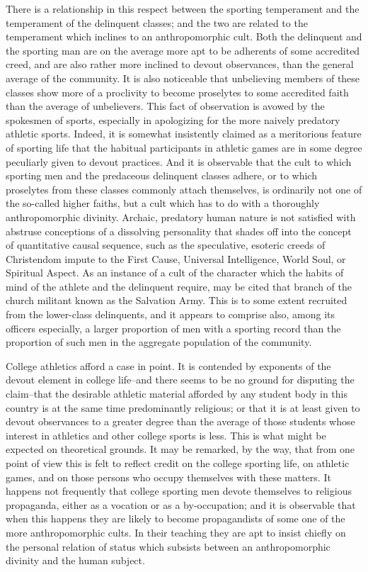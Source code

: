 \documentclass[12pt]{report}
\begin{document}
There is a relationship in this respect between the sporting temperament
and the temperament of the delinquent classes; and the two are related
to the temperament which inclines to an anthropomorphic cult. Both
the delinquent and the sporting man are on the average more apt to be
adherents of some accredited creed, and are also rather more inclined
to devout observances, than the general average of the community. It is
also noticeable that unbelieving members of these classes show more of
a proclivity to become proselytes to some accredited faith than the
average of unbelievers. This fact of observation is avowed by the
spokesmen of sports, especially in apologizing for the more naively
predatory athletic sports. Indeed, it is somewhat insistently claimed as
a meritorious feature of sporting life that the habitual participants in
athletic games are in some degree peculiarly given to devout practices.
And it is observable that the cult to which sporting men and the
predaceous delinquent classes adhere, or to which proselytes from
these classes commonly attach themselves, is ordinarily not one of the
so-called higher faiths, but a cult which has to do with a thoroughly
anthropomorphic divinity. Archaic, predatory human nature is not
satisfied with abstruse conceptions of a dissolving personality that
shades off into the concept of quantitative causal sequence, such as the
speculative, esoteric creeds of Christendom impute to the First Cause,
Universal Intelligence, World Soul, or Spiritual Aspect. As an instance
of a cult of the character which the habits of mind of the athlete and
the delinquent require, may be cited that branch of the church militant
known as the Salvation Army. This is to some extent recruited from the
lower-class delinquents, and it appears to comprise also, among its
officers especially, a larger proportion of men with a sporting record
than the proportion of such men in the aggregate population of the
community.

College athletics afford a case in point. It is contended by exponents
of the devout element in college life--and there seems to be no ground
for disputing the claim--that the desirable athletic material afforded
by any student body in this country is at the same time predominantly
religious; or that it is at least given to devout observances to a
greater degree than the average of those students whose interest in
athletics and other college sports is less. This is what might be
expected on theoretical grounds. It may be remarked, by the way, that
from one point of view this is felt to reflect credit on the college
sporting life, on athletic games, and on those persons who occupy
themselves with these matters. It happens not frequently that college
sporting men devote themselves to religious propaganda, either as a
vocation or as a by-occupation; and it is observable that when this
happens they are likely to become propagandists of some one of the more
anthropomorphic cults. In their teaching they are apt to insist
chiefly on the personal relation of status which subsists between an
anthropomorphic divinity and the human subject.
\end{document}
